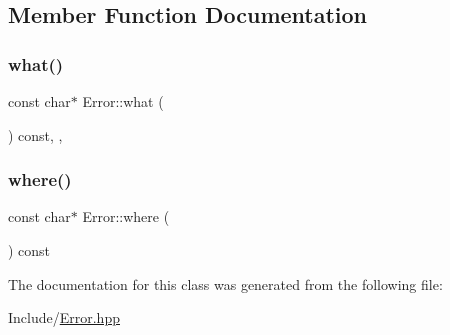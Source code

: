 \subsection{Member Function Documentation}
\mbox{\label{class_error_aba98fd2392ef0a6ac88623dfdca15102}} 
\subsubsection{\texorpdfstring{what()}{what()}}
{\footnotesize\ttfamily const char$\ast$ Error\+::what (\begin{DoxyParamCaption}{ }\end{DoxyParamCaption}) const\hspace{0.3cm}{\ttfamily [inline]}, {\ttfamily [override]}, {\ttfamily [noexcept]}}

\mbox{\label{class_error_afa9c352dd85cee1ec0d372a3fb0153b9}} 
\subsubsection{\texorpdfstring{where()}{where()}}
{\footnotesize\ttfamily const char$\ast$ Error\+::where (\begin{DoxyParamCaption}{ }\end{DoxyParamCaption}) const\hspace{0.3cm}{\ttfamily [inline]}}



The documentation for this class was generated from the following file\+:\begin{DoxyCompactItemize}
\item 
Include/\mbox{\hyperlink{_error_8hpp}{Error.\+hpp}}\end{DoxyCompactItemize}
